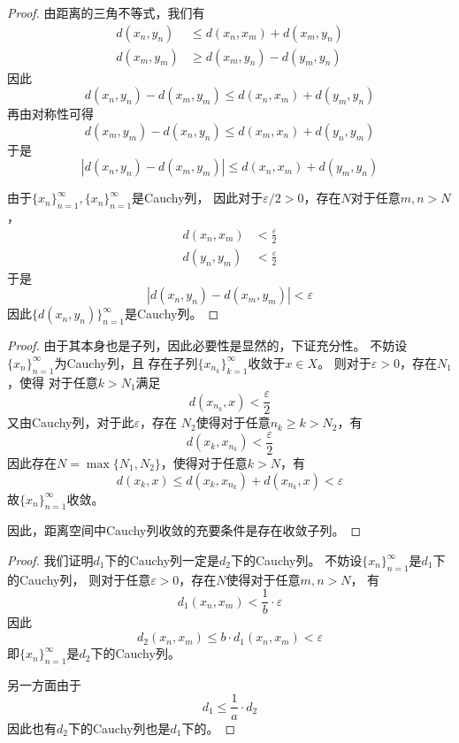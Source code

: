 \documentclass[cn]{homework}
\begin{document}
    \problem
    \begin{proof}
        由距离的三角不等式，我们有
        \begin{align*}
            d(x_n,y_n)&\leq d(x_n,x_m)+d(x_m,y_n)\\
            d(x_m,y_m)&\geq d(x_m,y_n)-d(y_m,y_n)
        \end{align*}
        因此
        \[d(x_n,y_n)-d(x_m,y_m)\leq d(x_n,x_m)+d(y_m,y_n)\]
        再由对称性可得
        \[d(x_m,y_m)-d(x_n,y_n)\leq d(x_m,x_n)+d(y_n,y_m)\]
        于是
        \[|d(x_n,y_n)-d(x_m,y_m)|\leq d(x_n,x_m)+d(y_m,y_n)\]
        
        由于$\{x_n\}_{n=1}^\infty,\{x_n\}_{n=1}^\infty$是Cauchy列，
        因此对于$\varepsilon/2>0$，存在$N$对于任意$m,n>N$，
        \begin{align*}
            d(x_n,x_m)&<\frac{\varepsilon}{2}\\
            d(y_n,y_m)&<\frac{\varepsilon}{2}
        \end{align*}
        于是
        \[|d(x_n,y_n)-d(x_m,y_m)|<\varepsilon\]
        因此$\{d(x_n,y_n)\}_{n=1}^\infty$是Cauchy列。
    \end{proof}

    \problem
    \begin{proof}
        由于其本身也是子列，因此必要性是显然的，下证充分性。
        不妨设$\{x_n\}_{n=1}^\infty$为Cauchy列，且
        存在子列$\{x_{n_k}\}_{k=1}^\infty$收敛于$x\in X$。
        则对于$\varepsilon>0$，存在$N_1$，使得
        对于任意$k>N_1$满足
        \[d(x_{n_k},x)<\frac{\varepsilon}{2}\]
        又由Cauchy列，对于此$\varepsilon$，存在
        $N_2$使得对于任意$n_k\geq k>N_2$，有
        \[d(x_k,x_{n_k})<\frac{\varepsilon}{2}\]
        因此存在$N=\max\{N_1,N_2\}$，使得对于任意$k>N$，有
        \[d(x_k,x)\leq d(x_k,x_{n_k})+d(x_{n_k},x)<\varepsilon\]
        故$\{x_n\}_{n=1}^\infty$收敛。

        因此，距离空间中Cauchy列收敛的充要条件是存在收敛子列。
    \end{proof}

    \problem
    \begin{proof}
        我们证明$d_1$下的Cauchy列一定是$d_2$下的Cauchy列。
        不妨设$\{x_n\}_{n=1}^\infty$是$d_1$下的Cauchy列，
        则对于任意$\varepsilon>0$，存在$N$使得对于任意$m,n>N$，
        有
        \[d_1(x_n,x_m)<\frac{1}{b}\cdot\varepsilon\]
        因此
        \[d_2(x_n,x_m)\leq b\cdot d_1(x_n,x_m)<\varepsilon\]
        即$\{x_n\}_{n=1}^\infty$是$d_2$下的Cauchy列。

        另一方面由于
        \[d_1\leq\frac{1}{a}\cdot d_2\]
        因此也有$d_2$下的Cauchy列也是$d_1$下的。
    \end{proof}
\end{document}
